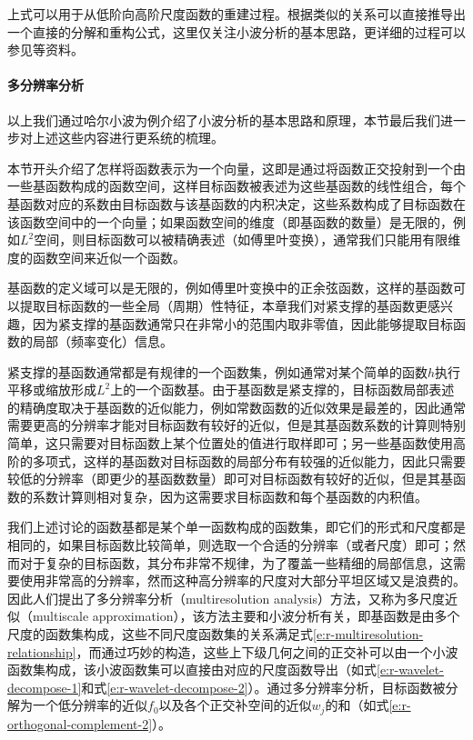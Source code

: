 \noindent 上式可以用于从低阶向高阶尺度函数的重建过程。根据类似的关系可以直接推导出一个直接的分解和重构公式，这里仅关注小波分析的基本思路，更详细的过程可以参见\cite{b:AFirstCourseinWaveletswithFourierAnalysis,b:AnIntroductiontoWavelets}等资料。




\paragraph{多分辨率分析}
以上我们通过哈尔小波为例介绍了小波分析的基本思路和原理，本节最后我们进一步对上述这些内容进行更系统的梳理。

本节开头介绍了怎样将函数表示为一个向量，这即是通过将函数正交投射到一个由一些基函数构成的函数空间，这样目标函数被表述为这些基函数的线性组合，每个基函数对应的系数由目标函数与该基函数的内积决定，这些系数构成了目标函数在该函数空间中的一个向量；如果函数空间的维度（即基函数的数量）是无限的，例如$L^{2}$空间，则目标函数可以被精确表述（如傅里叶变换），通常我们只能用有限维度的函数空间来近似一个函数。

基函数的定义域可以是无限的，例如傅里叶变换中的正余弦函数，这样的基函数可以提取目标函数的一些全局（周期）性特征，本章我们对紧支撑的基函数更感兴趣，因为紧支撑的基函数通常只在非常小的范围内取非零值，因此能够提取目标函数的局部（频率变化）信息。

紧支撑的基函数通常都是有规律的一个函数集，例如通常对某个简单的函数$h$执行平移或缩放形成$L^{2}$上的一个函数基。由于基函数是紧支撑的，目标函数局部表述的精确度取决于基函数的近似能力，例如常数函数的近似效果是最差的，因此通常需要更高的分辨率才能对目标函数有较好的近似，但是其基函数系数的计算则特别简单，这只需要对目标函数上某个位置处的值进行取样即可；另一些基函数使用高阶的多项式，这样的基函数对目标函数的局部分布有较强的近似能力，因此只需要较低的分辨率（即更少的基函数数量）即可对目标函数有较好的近似，但是其基函数的系数计算则相对复杂，因为这需要求目标函数和每个基函数的内积值。

我们上述讨论的函数基都是某个单一函数构成的函数集，即它们的形式和尺度都是相同的，如果目标函数比较简单，则选取一个合适的分辨率（或者尺度）即可；然而对于复杂的目标函数，其分布非常不规律，为了覆盖一些精细的局部信息，这需要使用非常高的分辨率，然而这种高分辨率的尺度对大部分平坦区域又是浪费的。因此人们提出了多分辨率分析（multiresolution analysis）方法，又称为多尺度近似（multiscale approximation），该方法主要和小波分析有关，即基函数是由多个尺度的函数集构成，这些不同尺度函数集的关系满足式\ref{e:r-multiresolution-relationship}，而通过巧妙的构造，这些上下级几何之间的正交补可以由一个小波函数集构成，该小波函数集可以直接由对应的尺度函数导出（如式\ref{e:r-wavelet-decompose-1}和式\ref{e:r-wavelet-decompose-2}）。通过多分辨率分析，目标函数被分解为一个低分辨率的近似$f_0$以及各个正交补空间的近似$w_j$的和（如式\ref{e:r-orthogonal-complement-2}）。

